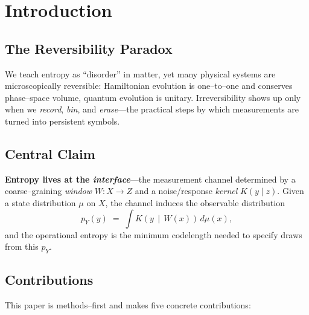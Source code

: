 \documentclass[11pt,letterpaper]{article}
\theoremstyle{definition}
\theoremstyle{remark}
\begin{document}
\tableofcontents
\newpage

\section{Introduction}

\subsection{The Reversibility Paradox}

We teach entropy as ``disorder'' in matter, yet many physical systems are microscopically reversible: Hamiltonian evolution is one--to--one and conserves phase--space volume, quantum evolution is unitary. Irreversibility shows up only when we \emph{record}, \emph{bin}, and \emph{erase}---the practical steps by which measurements are turned into persistent symbols.

\subsection{Central Claim}

\textbf{Entropy lives at the \emph{interface}}---the measurement channel determined by a coarse--graining \emph{window} \(W\!:\!X\!\to\!Z\) and a noise/response \emph{kernel} \(K(y\!\mid\!z)\). Given a state distribution \(\mu\) on \(X\), the channel induces the observable distribution
\[
p_Y(y) \;=\; \int K\!\left(y \,\middle|\, W(x)\right)\, d\mu(x),
\]
and the operational entropy is the minimum codelength needed to specify draws from this \(p_Y\).

\subsection{Contributions}

This paper is methods--first and makes five concrete contributions:
\end{document}
